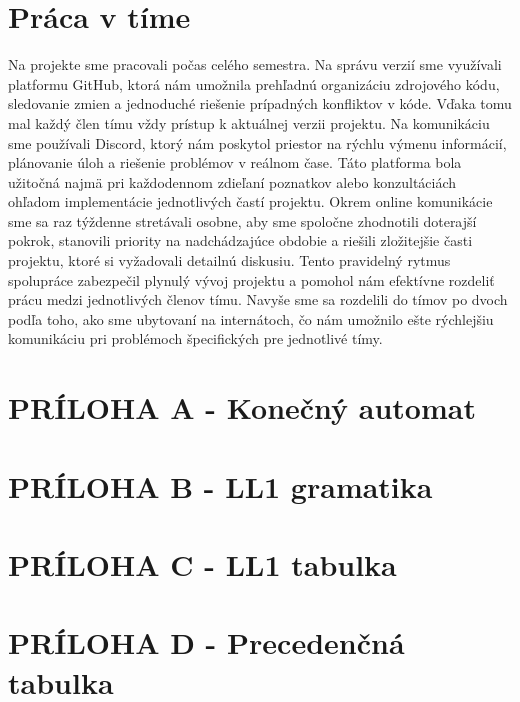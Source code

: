 \documentclass[Slovak, a4paper, 12pt]{article}
\begin{document}
	\section{Práca v tíme}
	Na projekte sme pracovali počas celého semestra. Na správu verzií sme využívali platformu GitHub, ktorá nám umožnila prehľadnú organizáciu zdrojového kódu, sledovanie zmien a jednoduché riešenie prípadných konfliktov v kóde. Vďaka tomu mal každý člen tímu vždy prístup k aktuálnej verzii projektu. Na komunikáciu sme používali Discord, ktorý nám poskytol priestor na rýchlu výmenu informácií, plánovanie úloh a riešenie problémov v reálnom čase. Táto platforma bola užitočná najmä pri každodennom zdieľaní poznatkov alebo konzultáciách ohľadom implementácie jednotlivých častí projektu. Okrem online komunikácie sme sa raz týždenne stretávali osobne, aby sme spoločne zhodnotili doterajší pokrok, stanovili priority na nadchádzajúce obdobie a riešili zložitejšie časti projektu, ktoré si vyžadovali detailnú diskusiu. Tento pravidelný rytmus spolupráce zabezpečil plynulý vývoj projektu a pomohol nám efektívne rozdeliť prácu medzi jednotlivých členov tímu. Navyše sme sa rozdelili do tímov po dvoch podľa toho, ako sme ubytovaní na internátoch, čo nám umožnilo ešte rýchlejšiu komunikáciu pri problémoch špecifických pre jednotlivé tímy.
	
	\newpage
	\section{PRÍLOHA A - Konečný automat}
	
	\newpage
	\section{PRÍLOHA B - LL1 gramatika}
	
	\newpage
	\section{PRÍLOHA C - LL1 tabulka}
	
	\newpage
	\section{PRÍLOHA D - Precedenčná tabulka}
	
\end{document}

